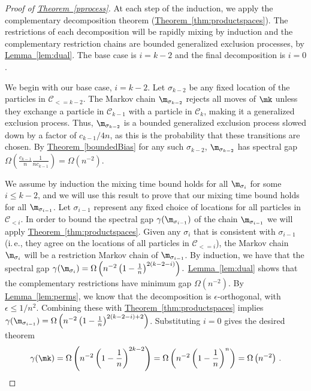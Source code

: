 \documentclass[11pt]{article}
\providecommand{\ie}{i.\,e.}
\providecommand{\expref}[2]{\texorpdfstring{\hyperref[#2]{#1~\ref{#2}}}{#1~\ref{#2}}}
\begin{document}
%
\begin{proof}[Proof of \expref{Theorem}{pprocess}]
At each step of the induction, we apply the complementary decomposition 
theorem (\expref{Theorem}{thm:productspaces}). The restrictions of each 
decomposition will be rapidly mixing by induction and the complementary 
restriction chains are bounded generalized exclusion processes, by 
\expref{Lemma}{lem:dual}.  The base case is $i=k-2$ and the final 
decomposition is $i=0$.
 
We begin with our base case, $i=k-2$.  
Let $\sigma_{k-2}$ be any fixed location of the particles in $\mathcal{C}_{<= k-2}.$ 
The Markov chain $\m_{\sigma_{k-2}}$ rejects all moves of $\mk$ unless 
they exchange a particle in $\mathcal{C}_{k-1}$ with a particle in 
$\mathcal{C}_{k}$,
making it a generalized exclusion process. Thus, 
$\m_{\sigma_{k-2}}$ is a bounded generalized exclusion process slowed 
down by a factor of $c_{k-1}/4n$, as this is the probability that 
these transitions are chosen.  By \expref{Theorem}{boundedBias} for any 
such $\sigma_{k-2}$, $\m_{\sigma_{k-2}}$ has spectral gap 
$\Omega(\frac{c_{k-1}}{n}\frac{1}{n c_{k-1}})=\Omega(n^{-2})$. 

We assume by induction the mixing time bound holds for all 
$\m_{\sigma_i}$ for some $i\leq k-2$, and we will use this result to 
prove that our mixing time bound holds for all $\m_{\sigma_{i-1}}$. Let 
$\sigma_{i-1}$ represent any fixed choice of locations for all 
particles in $\mathcal{C}_{< i}$.  In order to bound the spectral gap 
$\gamma( \m_{\sigma_{i-1}})$ of the chain $\m_{\sigma_{i-1}}$ we will 
apply \expref{Theorem}{thm:productspaces}.  Given any $\sigma_i$ that is 
consistent with $\sigma_{i-1}$ (\ie,  they agree on the locations of all 
particles in $\mathcal{C}_{<= i}$), the Markov chain $\m_{\sigma_i}$ 
will be a restriction Markov chain of $\m_{\sigma_{i-1}}$.  By 
induction, we have that the spectral gap $\gamma(\m_{\sigma_i})= 
\Omega\left(n^{-2}\left(1-\frac{1}{n}\right)^{2(k-2-i)}\right).$ 
\expref{Lemma}{lem:dual} shows that the complementary restrictions have 
minimum gap $\Omega(n^{-2}).$ By \expref{Lemma}{lem:perms}, we know that 
the decomposition is %
$\epsilon$-orthogonal, with $\epsilon\leq 1/n^2$. %
Combining these with 
\expref{Theorem}{thm:productspaces} implies $\gamma(\m_{\sigma_{i-1}})= 
\Omega\left(n^{-2}\left(1-\frac{1}{n}\right)^{2(k-2-i)+2}\right)$. 
Substituting $i = 0$ gives the desired theorem
%
\[
\gamma(\mk) = 
\Omega\left(n^{-2}\left(1-\frac{1}{n}\right)^{2k-2}\right) = 
\Omega\left(n^{-2}\left(1-\frac{1}{n}\right)^{n}\right) = 
\Omega\left(n^{-2}\right)\,.\qedhere
%
\]
\end{proof}
%
\end{document}
